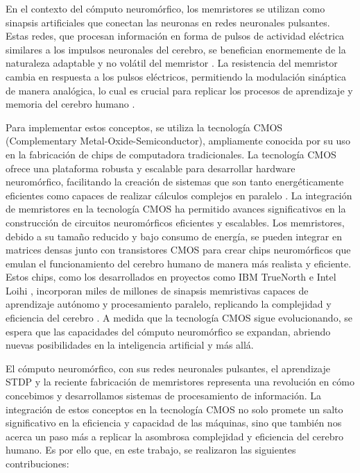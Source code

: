 \documentclass[conference]{IEEEtran}
\begin{document}
En el contexto del cómputo neuromórfico, los memristores se utilizan como sinapsis artificiales que conectan las neuronas en redes neuronales pulsantes. Estas redes, que procesan información en forma de pulsos de actividad eléctrica similares a los impulsos neuronales del cerebro, se benefician enormemente de la naturaleza adaptable y no volátil del memristor \cite{Saxena_2018}. La resistencia del memristor cambia en respuesta a los pulsos eléctricos, permitiendo la modulación sináptica de manera analógica, lo cual es crucial para replicar los procesos de aprendizaje y memoria del cerebro humano \cite{Amirsoleimani_2017}.

Para implementar estos conceptos, se utiliza la tecnología CMOS (Complementary Metal-Oxide-Semiconductor), ampliamente conocida por su uso en la fabricación de chips de computadora tradicionales. La tecnología CMOS ofrece una plataforma robusta y escalable para desarrollar hardware neuromórfico, facilitando la creación de sistemas que son tanto energéticamente eficientes como capaces de realizar cálculos complejos en paralelo \cite{Vohra_2023_2}. La integración de memristores en la tecnología CMOS ha permitido avances significativos en la construcción de circuitos neuromórficos eficientes y escalables. Los memristores, debido a su tamaño reducido y bajo consumo de energía, se pueden integrar en matrices densas junto con transistores CMOS para crear chips neuromórficos que emulan el funcionamiento del cerebro humano de manera más realista y eficiente. Estos chips, como los desarrollados en proyectos como IBM TrueNorth e Intel Loihi \cite{Barnell_2023}, incorporan miles de millones de sinapsis memristivas capaces de aprendizaje autónomo y procesamiento paralelo, replicando la complejidad y eficiencia del cerebro . A medida que la tecnología CMOS sigue evolucionando, se espera que las capacidades del cómputo neuromórfico se expandan, abriendo nuevas posibilidades en la inteligencia artificial y más allá.

El cómputo neuromórfico, con sus redes neuronales pulsantes, el aprendizaje STDP y la reciente fabricación de memristores representa una revolución en cómo concebimos y desarrollamos sistemas de procesamiento de información. La integración de estos conceptos en la tecnología CMOS no solo promete un salto significativo en la eficiencia y capacidad de las máquinas, sino que también nos acerca un paso más a replicar la asombrosa complejidad y eficiencia del cerebro humano. Es por ello que, en este trabajo, se realizaron las siguientes contribuciones:
\end{document}
